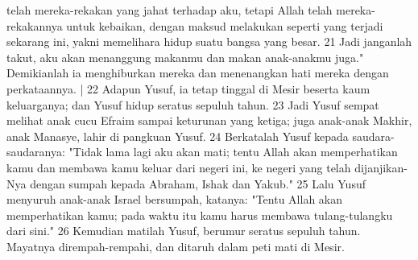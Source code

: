 \begin{biblechapter}
telah mereka-rekakan yang jahat terhadap aku, tetapi Allah telah mereka-rekakannya untuk kebaikan, dengan maksud melakukan seperti yang terjadi sekarang ini, yakni memelihara hidup suatu bangsa yang besar. 21 Jadi janganlah takut, aku akan menanggung makanmu dan makan anak-anakmu juga." Demikianlah ia menghiburkan mereka dan menenangkan hati mereka dengan perkataannya. | 22 Adapun Yusuf, ia tetap tinggal di Mesir beserta kaum keluarganya; dan Yusuf hidup seratus sepuluh tahun. 23 Jadi Yusuf sempat melihat anak cucu Efraim sampai keturunan yang ketiga; juga anak-anak Makhir, anak Manasye, lahir di pangkuan Yusuf. 24 Berkatalah Yusuf kepada saudara-saudaranya: "Tidak lama lagi aku akan mati; tentu Allah akan memperhatikan kamu dan membawa kamu keluar dari negeri ini, ke negeri yang telah dijanjikan-Nya dengan sumpah kepada Abraham, Ishak dan Yakub." 25 Lalu Yusuf menyuruh anak-anak Israel bersumpah, katanya: "Tentu Allah akan memperhatikan kamu; pada waktu itu kamu harus membawa tulang-tulangku dari sini." 26 Kemudian matilah Yusuf, berumur seratus sepuluh tahun. Mayatnya dirempah-rempahi, dan ditaruh dalam peti mati di Mesir.
\end{biblechapter}
